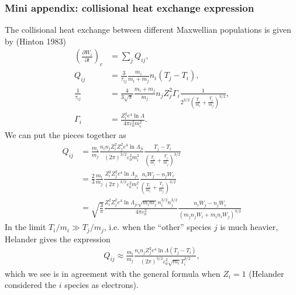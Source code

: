 \documentclass[11pt,a4paper]{article}
\begin{document}
\subsubsection*{Mini appendix: collisional heat exchange expression}
The collisional heat exchange between different Maxwellian populations is given by (Hinton 1983)
\begin{align}
\left(\frac{\partial W_i}{\partial t}\right)_c &= \sum_j Q_{ij}, \nonumber\\
Q_{ij} &= \frac{3}{\tau_{ij}}\frac{m_i}{m_i+m_j}n_i(T_j-T_i), \nonumber\\
\frac{1}{\tau_{ij}} &= \frac{4}{3\sqrt{\pi}}\frac{m_i+m_j}{m_j} n_j Z_j^2\Gamma_i \frac{1}{2^{3/2}\left(\frac{T_i}{m_i}+\frac{T_j}{m_j}\right)^{3/2}}, \nonumber\\
\Gamma_i &= \frac{Z_i^2 e^4 \ln\Lambda}{4\pi\varepsilon_0^2 m_i^2}.
\end{align}
We can put the pieces together as
\begin{align}
Q_{ij} &=\frac{m_i}{m_j} \frac{n_i n_j Z_i^2 Z_j^2 e^4 \ln\Lambda_{ji}}{(2\pi)^{3/2}\varepsilon_0^2 m_i^2}\frac{T_j-T_i}{\left(\frac{T_i}{m_i}+\frac{T_j}{m_j}\right)^{3/2}} \nonumber \\
&= \frac{2}{3}\frac{m_i}{m_j} \frac{Z_i^2 Z_j^2e^4\ln\Lambda_{ji}}{(2\pi)^{3/2}\varepsilon_0^2 m_i^2}\frac{n_iW_j-n_jW_i}{\left(\frac{T_i}{m_i}+\frac{T_j}{m_j}\right)^{3/2}} \nonumber \\
&= \sqrt{\frac{3}{\pi}}\frac{Z_i^2 Z_j^2 e^4 \ln\Lambda_{ji} \sqrt{m_i m_j} n_i^{3/2}n_j^{3/2}}{ 4\pi\varepsilon_0^2}\frac{n_i W_j - n_j W_i}{(m_j n_j W_i + m_i n_i W_j)^{3/2}}
\end{align}
In the limit $T_i/m_i \gg T_j/m_j$, i.e. when the ``other'' species $j$ is much heavier, Helander gives the expression
\begin{align}
Q_{ij} \approx \frac{m_i}{m_j}\frac{n_in_j Z_j^2 e^4\ln\Lambda (T_j-T_i)}{(2\pi)^{3/2}\varepsilon_0^2 \sqrt{m_i}T_i^{3/2}},
\end{align}
which we see is in agreement with the general formula when $Z_i=1$ (Helander considered the $i$ species as electrons). 
\end{document}
